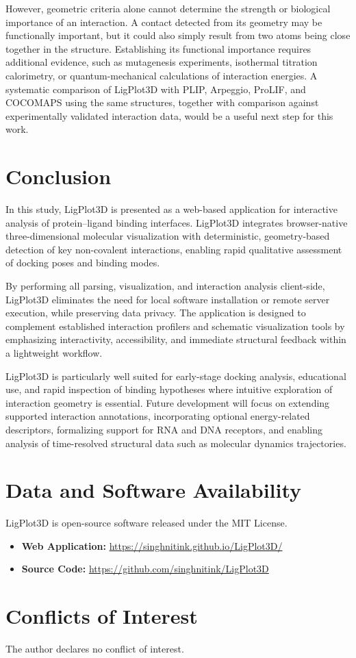 \documentclass[journal=jacsat,manuscript=article]{achemso}
\begin{document}
However, geometric criteria alone cannot determine the strength or biological importance of an interaction. A contact detected from its geometry may be functionally important, but it could also simply result from two atoms being close together in the structure. Establishing its functional importance requires additional evidence, such as mutagenesis experiments, isothermal titration calorimetry, or quantum-mechanical calculations of interaction energies. A systematic comparison of LigPlot3D with PLIP, Arpeggio, ProLIF, and COCOMAPS using the same structures, together with comparison against experimentally validated interaction data, would be a useful next step for this work.

\section{Conclusion}
In this study, LigPlot3D is presented as a web-based application for interactive analysis of protein--ligand binding interfaces. LigPlot3D integrates browser-native three-dimensional molecular visualization with deterministic, geometry-based detection of key non-covalent interactions, enabling rapid qualitative assessment of docking poses and binding modes.

By performing all parsing, visualization, and interaction analysis client-side, LigPlot3D eliminates the need for local software installation or remote server execution, while preserving data privacy. The application is designed to complement established interaction profilers and schematic visualization tools by emphasizing interactivity, accessibility, and immediate structural feedback within a lightweight workflow.

LigPlot3D is particularly well suited for early-stage docking analysis, educational use, and rapid inspection of binding hypotheses where intuitive exploration of interaction geometry is essential. Future development will focus on extending supported interaction annotations, incorporating optional energy-related descriptors, formalizing support for RNA and DNA receptors, and enabling analysis of time-resolved structural data such as molecular dynamics trajectories.

\section{Data and Software Availability}
LigPlot3D is open-source software released under the MIT License.
\begin{itemize}
    \item \textbf{Web Application:} \href{https://singhnitink.github.io/LigPlot3D/}{https://singhnitink.github.io/LigPlot3D/}
    \item \textbf{Source Code:} \href{https://github.com/singhnitink/LigPlot3D}{https://github.com/singhnitink/LigPlot3D}
\end{itemize}

\section{Conflicts of Interest}
The author declares no conflict of interest.


\end{document}
